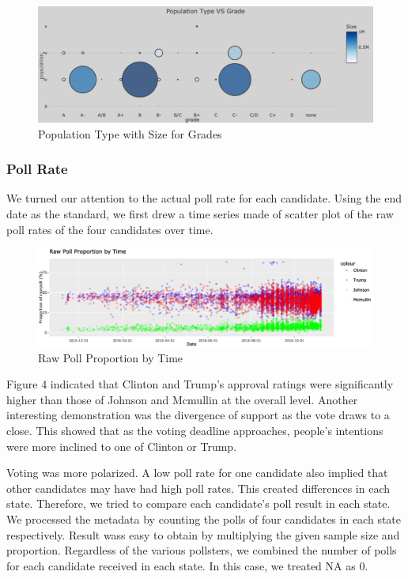 \documentclass[
  11pt,
]{article}
\begin{document}
\begin{figure}

{\centering \includegraphics{./Figures/popChart} 

}

\caption{Population Type with Size for Grades}\label{fig:unnamed-chunk-12}
\end{figure}

\hypertarget{poll-rate}{%
\subsubsection{Poll Rate}\label{poll-rate}}

We turned our attention to the actual poll rate for each candidate.
Using the end date as the standard, we first drew a time series made of
scatter plot of the raw poll rates of the four candidates over time.

\begin{figure}

{\centering \includegraphics{./Figures/dotChart} 

}

\caption{Raw Poll Proportion by Time}\label{fig:unnamed-chunk-15}
\end{figure}

Figure 4 indicated that Clinton and Trump's approval ratings were
significantly higher than those of Johnson and Mcmullin at the overall
level. Another interesting demonstration was the divergence of support
as the vote draws to a close. This showed that as the voting deadline
approaches, people's intentions were more inclined to one of Clinton or
Trump.

Voting was more polarized. A low poll rate for one candidate also
implied that other candidates may have had high poll rates. This created
differences in each state. Therefore, we tried to compare each
candidate's poll result in each state. We processed the metadata by
counting the polls of four candidates in each state respectively. Result
wass easy to obtain by multiplying the given sample size and proportion.
Regardless of the various pollsters, we combined the number of polls for
each candidate received in each state. In this case, we treated NA as 0.
\end{document}

